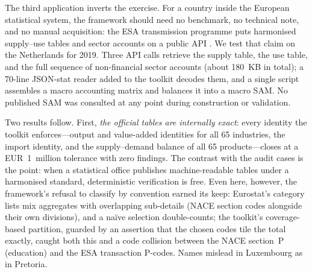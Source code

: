 The third application inverts the exercise. For a country inside the
European statistical system, the framework should need no benchmark, no
technical note, and no manual acquisition: the ESA transmission programme
puts harmonised supply--use tables and sector accounts on a public API
\citep{eurostat2008}. We test that claim on the Netherlands for 2019.
Three API calls retrieve the supply table, the use table, and the full
sequence of non-financial sector accounts (about 180~KB in total); a
70-line JSON-stat reader added to the toolkit decodes them, and a single
script assembles a macro accounting matrix and balances it into a macro
SAM. No published SAM was consulted at any point during construction or
validation.

Two results follow. First, \emph{the official tables are internally
exact}: every identity the toolkit enforces---output and value-added
identities for all 65 industries, the import identity, and the
supply--demand balance of all 65 products---closes at a EUR~1~million
tolerance with zero findings. The contrast with the audit cases is the
point: when a statistical office publishes machine-readable tables under a
harmonised standard, deterministic verification is free. Even here,
however, the framework's refusal to classify by convention earned its
keep: Eurostat's category lists mix aggregates with overlapping
sub-details (NACE section codes alongside their own divisions), and a
na\"ive selection double-counts; the toolkit's coverage-based partition,
guarded by an assertion that the chosen codes tile the total exactly,
caught both this and a code collision between the NACE section~P
(education) and the ESA transaction P-codes. Names mislead in Luxembourg
as in Pretoria.

